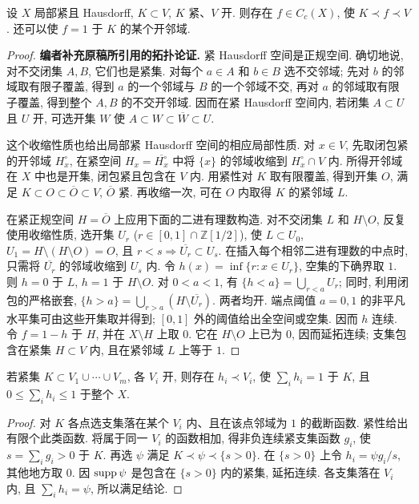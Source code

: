 \begin{lemma}[局部紧空间的截断函数]\label{ra:c4:urysohn}
设 $X$ 局部紧且 Hausdorff, $K\subset V$, $K$ 紧、$V$ 开. 则存在 $f\in C_c(X)$, 使 $K\prec f\prec V$. 还可以使 $f=1$ 于 $K$ 的某个开邻域.
\end{lemma}
\begin{proof}
\textbf{编者补充原稿所引用的拓扑论证.} 紧 Hausdorff 空间是正规空间. 确切地说, 对不交闭集 $A,B$, 它们也是紧集. 对每个 $a\in A$ 和 $b\in B$ 选不交邻域; 先对 $b$ 的邻域取有限子覆盖, 得到 $a$ 的一个邻域与 $B$ 的一个邻域不交, 再对 $a$ 的邻域取有限子覆盖, 得到整个 $A,B$ 的不交开邻域. 因而在紧 Hausdorff 空间内, 若闭集 $A\subset U$ 且 $U$ 开, 可选开集 $W$ 使 $A\subset W\subset\overline W\subset U$.

这个收缩性质也给出局部紧 Hausdorff 空间的相应局部性质. 对 $x\in V$, 先取闭包紧的开邻域 $H^\circ_x$, 在紧空间 $H_x=\overline{H^\circ_x}$ 中将 $\{x\}$ 的邻域收缩到 $H^\circ_x\cap V$ 内. 所得开邻域在 $X$ 中也是开集, 闭包紧且包含在 $V$ 内. 用紧性对 $K$ 取有限覆盖, 得到开集 $O$, 满足 $K\subset O\subset\overline O\subset V$, $\overline O$ 紧. 再收缩一次, 可在 $O$ 内取得 $K$ 的紧邻域 $L$.

在紧正规空间 $H=\overline O$ 上应用下面的二进有理数构造. 对不交闭集 $L$ 和 $H\setminus O$, 反复使用收缩性质, 选开集 $U_r$ ($r\in[0,1]\cap\mathbb Z[1/2]$), 使 $L\subset U_0$, $U_1=H\setminus(H\setminus O)=O$, 且 $r<s\Rightarrow\overline{U_r}\subset U_s$. 在插入每个相邻二进有理数的中点时, 只需将 $\overline{U_r}$ 的邻域收缩到 $U_s$ 内. 令 $h(x)=\inf\{r:x\in U_r\}$, 空集的下确界取 $1$. 则 $h=0$ 于 $L$, $h=1$ 于 $H\setminus O$. 对 $0<a<1$, 有 $\{h<a\}=\bigcup_{r<a}U_r$; 同时, 利用闭包的严格嵌套, $\{h>a\}=\bigcup_{r>a}(H\setminus\overline{U_r})$. 两者均开. 端点阈值 $a=0,1$ 的非平凡水平集可由这些开集取并得到; $[0,1]$ 外的阈值给出全空间或空集. 因而 $h$ 连续. 令 $f=1-h$ 于 $H$, 并在 $X\setminus H$ 上取 $0$. 它在 $H\setminus O$ 上已为 $0$, 因而延拓连续; 支集包含在紧集 $H\subset V$ 内, 且在紧邻域 $L$ 上等于 $1$.
\end{proof}

\begin{lemma}[有限单位分解]\label{ra:c4:partition}
若紧集 $K\subset V_1\cup\cdots\cup V_m$, 各 $V_i$ 开, 则存在 $h_i\prec V_i$, 使 $\sum_ih_i=1$ 于 $K$, 且 $0\le\sum_ih_i\le1$ 于整个 $X$.
\end{lemma}
\begin{proof}
对 $K$ 各点选支集落在某个 $V_i$ 内、且在该点邻域为 $1$ 的截断函数. 紧性给出有限个此类函数. 将属于同一 $V_i$ 的函数相加, 得非负连续紧支集函数 $g_i$, 使 $s=\sum_ig_i>0$ 于 $K$. 再选 $\psi$ 满足 $K\prec\psi\prec\{s>0\}$. 在 $\{s>0\}$ 上令 $h_i=\psi g_i/s$, 其他地方取 $0$. 因 $\operatorname{supp}\psi$ 是包含在 $\{s>0\}$ 内的紧集, 延拓连续. 各支集落在 $V_i$ 内, 且 $\sum_ih_i=\psi$, 所以满足结论.
\end{proof}

